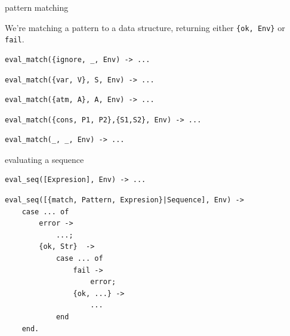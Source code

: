 \begin{frame}[fragile]{pattern matching}

We're matching a pattern to a data structure, returning either \verb+{ok, Env}+ or \verb+fail+.

\begin{verbatim}
eval_match({ignore, _, Env) -> ...
\end{verbatim}
\pause
\begin{verbatim}
eval_match({var, V}, S, Env) -> ... 
\end{verbatim}
\pause
\begin{verbatim}
eval_match({atm, A}, A, Env) -> ...
\end{verbatim}
\pause
\begin{verbatim}
eval_match({cons, P1, P2},{S1,S2}, Env) -> ... 
\end{verbatim}
\pause
\begin{verbatim}
eval_match(_, _, Env) -> ...
\end{verbatim}

\end{frame}

\begin{frame}[fragile]{evaluating a sequence}

\begin{verbatim}
eval_seq([Expresion], Env) -> ...
\end{verbatim}

\begin{verbatim}
eval_seq([{match, Pattern, Expresion}|Sequence], Env) ->
    case ... of
        error -> 
            ...;
        {ok, Str}  ->
            case ... of
                fail ->
                    error;
                {ok, ...} ->
                    ...
            end
    end.
\end{verbatim}


\end{frame}

